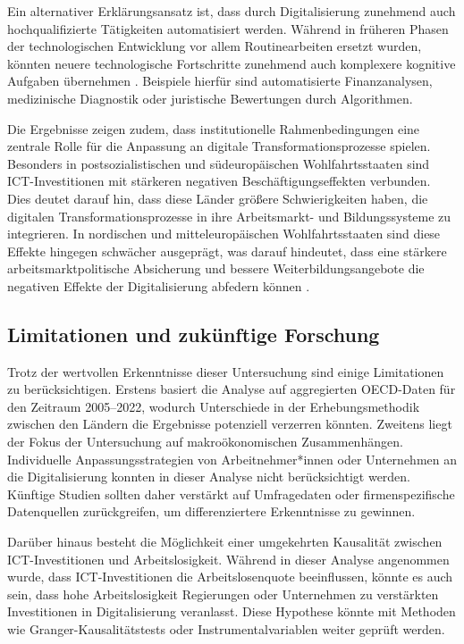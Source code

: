 Ein alternativer Erklärungsansatz ist, dass durch Digitalisierung zunehmend auch 
hochqualifizierte Tätigkeiten automatisiert werden. Während in früheren Phasen der 
technologischen Entwicklung vor allem Routinearbeiten ersetzt wurden, könnten neuere 
technologische Fortschritte zunehmend auch komplexere kognitive Aufgaben übernehmen 
\parencite[vgl.][S. 2-4]{frey2013thefuture}. Beispiele hierfür sind automatisierte 
Finanzanalysen, medizinische Diagnostik oder juristische Bewertungen durch Algorithmen.

Die Ergebnisse zeigen zudem, dass institutionelle Rahmenbedingungen eine zentrale Rolle 
für die Anpassung an digitale Transformationsprozesse spielen. Besonders in 
postsozialistischen und südeuropäischen Wohlfahrtsstaaten sind \ac{ICT}-Investitionen mit 
stärkeren negativen Beschäftigungseffekten verbunden. Dies deutet darauf hin, dass diese 
Länder größere Schwierigkeiten haben, die digitalen Transformationsprozesse in ihre 
Arbeitsmarkt- und Bildungssysteme zu integrieren. In nordischen und mitteleuropäischen 
Wohlfahrtsstaaten sind diese Effekte hingegen schwächer ausgeprägt, was darauf hindeutet, 
dass eine stärkere arbeitsmarktpolitische Absicherung und bessere Weiterbildungsangebote 
die negativen Effekte der Digitalisierung abfedern können 
\parencite[vgl.][S. 27-30]{espingandersen1990thethree}.

\subsection{Limitationen und zukünftige Forschung}

Trotz der wertvollen Erkenntnisse dieser Untersuchung sind einige Limitationen zu 
berücksichtigen. Erstens basiert die Analyse auf aggregierten \ac{OECD}-Daten für den 
Zeitraum 2005–2022, wodurch Unterschiede in der Erhebungsmethodik zwischen den 
Ländern die Ergebnisse potenziell verzerren könnten. Zweitens liegt der Fokus der 
Untersuchung auf makroökonomischen Zusammenhängen. Individuelle Anpassungsstrategien 
von Arbeitnehmer*innen oder Unternehmen an die Digitalisierung konnten in dieser 
Analyse nicht berücksichtigt werden. Künftige Studien sollten daher verstärkt auf 
Umfragedaten oder firmenspezifische Datenquellen zurückgreifen, um differenziertere 
Erkenntnisse zu gewinnen.

Darüber hinaus besteht die Möglichkeit einer umgekehrten Kausalität zwischen ICT-Investitionen 
und Arbeitslosigkeit. Während in dieser Analyse angenommen wurde, dass ICT-Investitionen 
die Arbeitslosenquote beeinflussen, könnte es auch sein, dass hohe Arbeitslosigkeit 
Regierungen oder Unternehmen zu verstärkten Investitionen in Digitalisierung veranlasst. 
Diese Hypothese könnte mit Methoden wie Granger-Kausalitätstests oder Instrumentalvariablen 
weiter geprüft werden.

